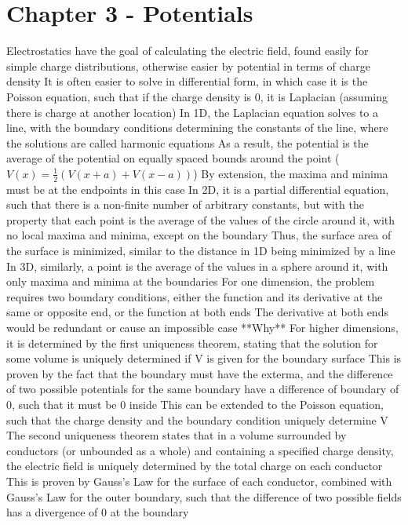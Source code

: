 \documentclass[11 pt, twoside]{article}
\newenvironment{outline*}
{
	\begin{outline}[enumerate]
	}
	{\end{outline}
}
\begin{document}
\section{Chapter 3 - Potentials}
\begin{outline*}
\1 Electrostatics have the goal of calculating the electric field, found easily for simple charge distributions, otherwise easier by potential in terms of charge density
	\2 It is often easier to solve in differential form, in which case it is the Poisson equation, such that if the charge density is 0, it is Laplacian (assuming there is charge at another location)
\1 In 1D, the Laplacian equation solves to a line, with the boundary conditions determining the constants of the line, where the solutions are called harmonic equations
	\2 As a result, the potential is the average of the potential on equally spaced bounds around the point ($V(x) = \frac{1}{2}(V(x + a) + V(x - a))$)
		\3 By extension, the maxima and minima must be at the endpoints in this case
	\2 In 2D, it is a partial differential equation, such that there is a non-finite number of arbitrary constants, but with the property that each point is the average of the values of the circle around it, with no local maxima and minima, except on the boundary
		\3 Thus, the surface area of the surface is minimized, similar to the distance in 1D being minimized by a line
	\2 In 3D, similarly, a point is the average of the values in a sphere around it, with only maxima and minima at the boundaries
	\2 For one dimension, the problem requires two boundary conditions, either the function and its derivative at the same or opposite end, or the function at both ends
		\3 The derivative at both ends would be redundant or cause an impossible case **Why**
		\3 For higher dimensions, it is determined by the first uniqueness theorem, stating that the solution for some volume is uniquely determined if V is given for the boundary surface
			\4 This is proven by the fact that the boundary must have the exterma, and the difference of two possible potentials for the same boundary have a difference of boundary of 0, such that it must be 0 inside
			\4 This can be extended to the Poisson equation, such that the charge density and the boundary condition uniquely determine V
		\3 The second uniqueness theorem states that in a volume surrounded by conductors (or unbounded as a whole) and containing a specified charge density, the electric field is uniquely determined by the total charge on each conductor
			\4 This is proven by Gauss's Law for the surface of each conductor, combined with Gauss's Law for the outer boundary, such that the difference of two possible fields has a divergence of 0 at the boundary

\end{outline*}
\end{document}
